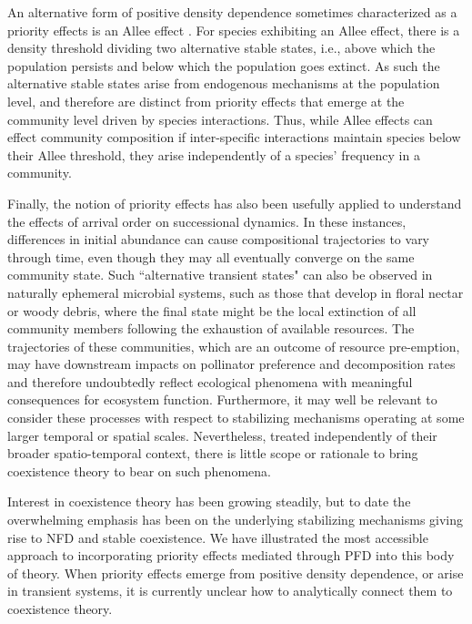 An alternative form of positive density dependence sometimes characterized as a priority effects is an Allee effect \citep{Petraitis2013}. For species exhibiting an Allee effect, there is a density threshold dividing two alternative stable states, i.e., above which the population persists and below which the population goes extinct. As such the alternative stable states arise from endogenous mechanisms at the population level, and therefore are distinct from priority effects that emerge at the community level driven by species interactions. Thus, while Allee effects can effect community composition if inter-specific interactions maintain species below their Allee threshold, they arise independently of a species' frequency in a community. 
\par


Finally, the notion of priority effects has also been usefully applied to understand the effects of arrival order on successional dynamics. In these instances, differences in initial abundance can cause compositional trajectories to vary through time, even though they may all eventually converge on the same community state. Such ``alternative transient states" \citep{FukamiNakajima2011} can also be observed in naturally ephemeral microbial systems, such as those that develop in floral nectar or woody debris, where the final state might be the local extinction of all community members following the exhaustion of available resources. The trajectories of these communities, which are an outcome of resource pre-emption, may have downstream impacts on pollinator preference and decomposition rates and therefore undoubtedly reflect ecological phenomena with meaningful consequences for ecosystem function. Furthermore, it may well be relevant to consider these processes with respect to stabilizing mechanisms operating at some larger temporal or spatial scales. Nevertheless, treated independently of their broader spatio-temporal context, there is little scope or rationale to bring coexistence theory to bear on such phenomena. 
\par


Interest in coexistence theory has been growing steadily, but to date the overwhelming emphasis has been on the underlying stabilizing mechanisms giving rise to NFD and stable coexistence. We have illustrated the most accessible approach to incorporating priority effects mediated through PFD into this body of theory. When priority effects emerge from positive density dependence, or arise in transient systems, it is currently unclear how to analytically connect them to coexistence theory. 
\par



